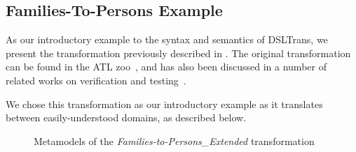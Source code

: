 \subsection{Families-To-Persons Example}

As our introductory example to the syntax and semantics of DSLTrans, we present the \FTP transformation previously described in \cite{Oakes2016}. The original \FTP transformation can be
found in the ATL zoo~\cite{atlZoo}, and has also been discussed in a number of related works on verification and testing~\cite{Gogolla2011}.

We chose this \FTP transformation as our introductory example as it translates between easily-understood domains, as described below.

\begin{figure}[bt]
\centering
{}
\caption{Metamodels of the \emph{Families-to-Persons\_Extended} transformation}\label{fig:metamodels}
\end{figure}

